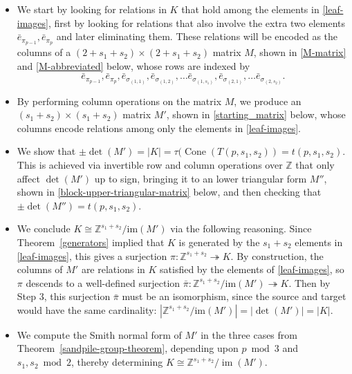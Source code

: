 \documentclass[10pt,reqno]{amsart}
\newcommand{\Z}{\mathbb{Z}}
\DeclareMathOperator{\Cone}{Cone}
\DeclareMathOperator{\im}{im}
\begin{document}
\begin{itemize}
\item [{\sf Step 1.}]
We start by looking for relations in $K$ that hold among the  elements in \eqref{leaf-images}, first by looking for relations that also involve the
extra two elements 
$
\bar{e}_{\pi_{p-1}},
\bar{e}_{\pi_p}
$
and later eliminating them.
These relations will be encoded as the columns of a
$(2+s_1+s_2)\times (2+s_1+s_2)$ matrix $M$, shown in 
\eqref{M-matrix} and \eqref{M-abbreviated} below,
whose rows are indexed by 
\begin{equation}
\label{leaves-plus-path-endpoints}
\bar{e}_{\pi_{p-1}},
\bar{e}_{\pi_p},\bar{e}_{\sigma_{(1,1)}},
\bar{e}_{\sigma_{(1,2)}},
\ldots
\bar{e}_{\sigma_{(1,s_1)}},
\bar{e}_{\sigma_{(2,1)}},
\ldots
\bar{e}_{\sigma_{(2,s_2)}}.
\end{equation}



\item [{\sf Step 2.}]
By performing column operations on the matrix $M$, we produce
an $(s_1+s_2) \times (s_1+s_2)$ matrix $M'$, shown in \eqref{starting_matrix} below, whose columns encode relations
among only the elements in \eqref{leaf-images}.


\item [{\sf Step 3.}]
We show that $\pm \det(M')=|K|=\tau(\Cone(T(p,s_1,s_2))=t(p,s_1,s_2)$.
This is achieved 
via invertible row and column operations over $\mathbb{Z}$
that only affect $\det(M')$ up to sign, bringing it to an lower triangular form
$M''$, shown in \eqref{block-upper-triangular-matrix} below, and then checking that $\pm \det(M'')=t(p,s_1,s_2)$.
\item [{\sf Step 4.}]
We conclude $K \cong \Z^{s_1 + s_2}/\text{im}(M')$ via the following reasoning. Since Theorem~\ref{generators} implied that 
$K$ is generated by the $s_1+s_2$ elements
in \eqref{leaf-images},
this gives a surjection
$
\pi: \Z^{s_1 + s_2} \twoheadrightarrow K.
$
By construction, the columns of $M'$ are relations in $K$ satisfied by the elements of \eqref{leaf-images}, so $\pi$ 
descends to a well-defined surjection
$
\bar{\pi}: \Z^{s_1 + s_2}/\text{im}(M') \twoheadrightarrow K.
$
Then by {\sf Step 3},
this surjection $\bar{\pi}$ must be an isomorphism, since the source and target would have the same cardinality:
$
|\Z^{s_1 + s_2}/\text{im}(M')|=|\det(M')|=|K|.
$


\item [{\sf Step 5.}] We compute the Smith normal form of $M'$ in the three cases from Theorem~\ref{sandpile-group-theorem}, depending upon $p \bmod{3}$ and $s_1, s_2 \bmod{2}$,
thereby determining $K \cong \Z^{s_1+s_2}/\im(M')$.
\end{itemize}
\end{document}

